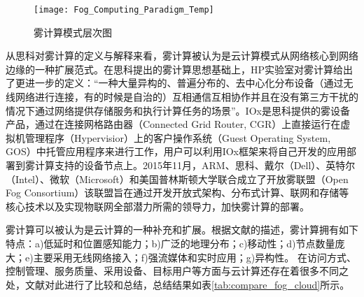 \begin{figure}[htbp]
    \centering
    \texttt{[image: Fog\_Computing\_Paradigm\_Temp]}
    \caption{雾计算模式层次图}
    \label{fig:fog_computing_paradigm}
\end{figure}

从思科对雾计算的定义与解释来看，雾计算被认为是云计算模式从网络核心到网络边缘的一种扩展范式。在思科提出的雾计算思想基础上，HP实验室对雾计算给出了更进一步的定义：“一种大量异构的、普遍分布的、去中心化分布设备（通过无线网络进行连接，有的时候是自治的）互相通信互相协作并且在没有第三方干扰的情况下通过网络提供存储服务和执行计算任务的场景”\cite{vaquero2014finding}。IOx是思科提供的雾设备产品，通过在连接网格路由器（Connected Grid Router, CGR）上直接运行在虚拟机管理程序（Hypervisior）上的客户操作系统（Guest Operating System, GOS）中托管应用程序来进行工作\cite{yi2015survey}，用户可以利用IOx框架来将自己开发的应用部署到雾计算支持的设备节点上。2015年11月，ARM、思科、戴尔（Dell）、英特尔（Intel）、微软（Microsoft）和美国普林斯顿大学联合成立了开放雾联盟（Open Fog Consortium）该联盟旨在通过开发开放式架构、分布式计算、联网和存储等核心技术以及实现物联网全部潜力所需的领导力，加快雾计算的部署\cite{李子姝2018移动边缘计算综述}。

雾计算可以被认为是云计算的一种补充和扩展。根据文献\cite{bonomi2012fog}的描述，雾计算拥有如下特点：a)低延时和位置感知能力；b)广泛的地理分布；c)移动性；d)节点数量庞大；e)主要采用无线网络接入；f)强流媒体和实时应用；g)异构性。
在访问方式、控制管理、服务质量、采用设备、目标用户等方面与云计算还存在着很多不同之处，文献\cite{贾维嘉2018雾计算的概念}对此进行了比较和总结，总结结果如表\ref{tab:compare_fog_cloud}所示。

